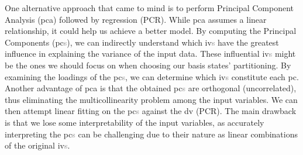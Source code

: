 One alternative approach that came to mind is to perform Principal Component Analysis (\acrshort{pca}) followed by regression (PCR). While \acrshort{pca} assumes a linear relationship, it could help us achieve a better model. By computing the Principal Components (\acrshort{pc}\textcolor{gray}{s}), we can indirectly understand which \acrshort{iv}\textcolor{gray}{s} have the greatest influence in explaining the variance of the input data. These influential \acrshort{iv}\textcolor{gray}{s} might be the ones we should focus on when choosing our basis states' partitioning. By examining the loadings of the \acrshort{pc}\textcolor{gray}{s}, we can determine which \acrshort{iv}\textcolor{gray}{s} constitute each \acrshort{pc}. Another advantage of \acrshort{pca} is that the obtained \acrshort{pc}\textcolor{gray}{s} are orthogonal (uncorrelated), thus eliminating the multicollinearity problem among the input variables. We can then attempt linear fitting on the \acrshort{pc}\textcolor{gray}{s} against the \acrshort{dv} (PCR). The main drawback is that we lose some interpretability of the input variables, as accurately interpreting the \acrshort{pc}\textcolor{gray}{s} can be challenging due to their nature as linear combinations of the original \acrshort{iv}\textcolor{gray}{s}.

